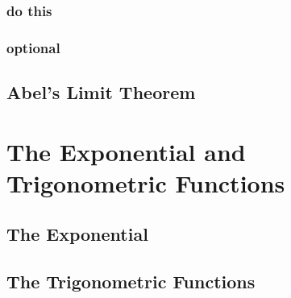 \subsubsection{do this}
\subsubsection{optional}
\subsubsection{}
\subsubsection{}
\subsubsection{}
\subsubsection{}

\subsection{Abel's Limit Theorem}

\section{The Exponential and Trigonometric Functions}
\subsection{The Exponential}

\subsection{The Trigonometric Functions}
\subsubsection{}
\subsubsection{}
\subsubsection{}
\subsubsection{}

